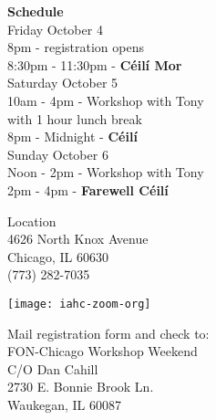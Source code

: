 \documentclass[12pt,
letterpaper]{leaflet}
\begin{document}
\begin{flushleft}
{\large \textbf{Schedule}}\\ 
\vspace*{2em}
Friday October 4\\
\hspace*{3em}  8pm  - registration opens\\
\hspace*{3em}  8:30pm  - 11:30pm  - \textbf{C\'{e}il\'{i} Mor}\\

Saturday October 5\\
\hspace*{3em}  10am - 4pm  - Workshop with Tony\\
\hspace*{3em}  {\small with 1 hour lunch break}\\

\hspace*{3em}  8pm - Midnight - \textbf{C\'{e}il\'{i}}\\

Sunday October 6\\
\hspace*{3em}  Noon - 2pm  - Workshop  with Tony \\

 \hspace*{3em} 2pm - 4pm - \textbf{Farewell C\'{e}il\'{i}}\\
\end{flushleft}

Location\\
4626 North Knox Avenue\\
Chicago, IL 60630\\
(773) 282-7035
%

\vspace*{0.05em}
\begin{center}
\texttt{[image: iahc-zoom-org]}
\end{center}

\pagebreak

\pagebreak

\begin{landscape}

\hspace*{15em}
\begin{minipage}[t]{\textwidth}
\vspace{0pt}
Mail registration form and check to:\\

{\large
FON-Chicago Workshop Weekend\\
C/O Dan Cahill\\
2730 E. Bonnie Brook Ln.\\ Waukegan, IL 60087
}
\end{minipage}
\end{landscape}
\end{document}
